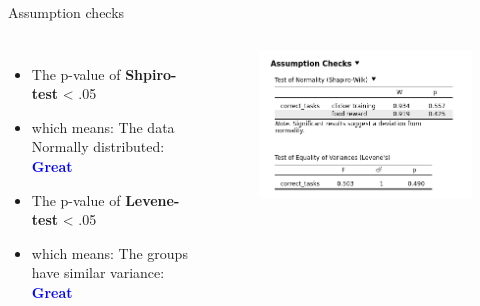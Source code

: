 \documentclass[8pt]{beamer}
\begin{document}
        \begin{frame}{Assumption checks}
            \begin{columns}
                \begin{itemize}
                    \item The p-value of \textbf{Shpiro-test} < .05
                    \item which means: The data Normally distributed: \textcolor{blue}{\textbf{Great}}
                    \item The p-value of \textbf{Levene-test} < .05
                    \item which means: The groups have similar variance: \textcolor{blue}{\textbf{Great}}
                \end{itemize}
                \begin{figure}
                    \includegraphics[width=.95\textwidth]{images/indep assumptions.png}
                    \vspace{.25cm}
                \end{figure}
            \end{columns}
        \end{frame}
\end{document}
